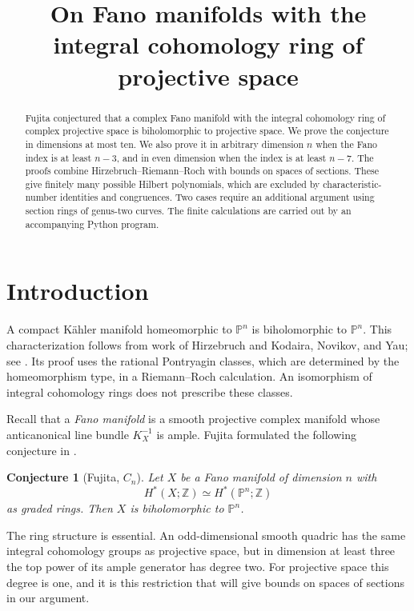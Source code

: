 \documentclass[11pt,reqno,letterpaper]{amsart}
\title[Fano manifolds with the cohomology ring of projective space]{On Fano manifolds with the integral cohomology ring of projective space}
\date{}
\newcommand{\Z}{\mathbb Z}
\newcommand{\PP}{\mathbb P}
\newtheorem{conjecture}[theorem]{Conjecture}
\theoremstyle{definition}
\numberwithin{equation}{section}
\begin{document}
\begin{abstract}
Fujita conjectured that a complex Fano manifold with the integral cohomology
ring of complex projective space is biholomorphic to projective space.
We prove the conjecture in dimensions at most ten. We also prove it in
arbitrary dimension $n$ when the Fano index is at least $n-3$, and in even
dimension when the index is at least $n-7$. The proofs combine
Hirzebruch--Riemann--Roch with bounds on spaces of sections. These give
finitely many possible Hilbert polynomials, which are excluded by
characteristic-number identities and congruences. Two cases require an
additional argument using section rings of genus-two curves. The finite
calculations are carried out by an accompanying Python program.
\end{abstract}
\maketitle

\section{Introduction}\label{sec:intro}

A compact K\"ahler manifold homeomorphic to $\PP^n$ is biholomorphic to
$\PP^n$. This characterization follows from work of Hirzebruch and
Kodaira, Novikov, and Yau; see \cite[Theorem 1]{debarre}. Its proof uses
the rational Pontryagin classes, which are determined by the
homeomorphism type, in a Riemann--Roch calculation. An isomorphism of
integral cohomology rings does not prescribe these classes.

Recall that a \emph{Fano manifold} is a smooth projective complex
manifold whose anticanonical line bundle $K_X^{-1}$ is ample.
Fujita formulated the following conjecture in \cite[\S1]{fujita}.

\begin{conjecture}[Fujita, $C_n$]\label{conj:fujita}
Let $X$ be a Fano manifold of dimension $n$ with
\[
 H^*(X;\Z)\simeq H^*(\PP^n;\Z)
\]
as graded rings. Then $X$ is biholomorphic to $\PP^n$.
\end{conjecture}

The ring structure is essential. An odd-dimensional smooth quadric has
the same integral cohomology groups as projective space, but in dimension
at least three the top power of its ample generator has degree two.
For projective space this degree is one, and it is this restriction that
will give bounds on spaces of sections in our argument.
\end{document}
